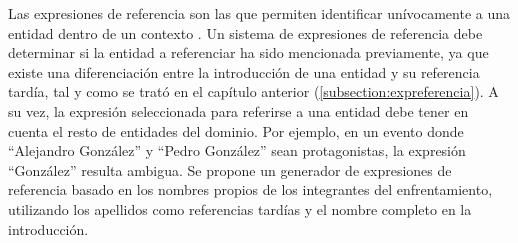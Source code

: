 Las expresiones de referencia son las que permiten identificar unívocamente a una entidad dentro de un contexto . 
Un sistema de expresiones de referencia debe determinar si la entidad a referenciar ha sido mencionada previamente, ya que existe una diferenciación entre la 
introducción de una entidad y su referencia tardía, tal y como se trató en el capítulo anterior (\ref{subsection:expreferencia}). A su vez, la expresión seleccionada 
para referirse a una entidad debe tener en cuenta el resto de entidades del dominio. Por ejemplo, en un evento donde “Alejandro González” y “Pedro González” sean 
protagonistas, la expresión “González” resulta ambigua. Se propone un generador de expresiones de referencia basado en los nombres propios de los integrantes del 
enfrentamiento, utilizando los apellidos como referencias tardías y el nombre completo en la introducción.



    


